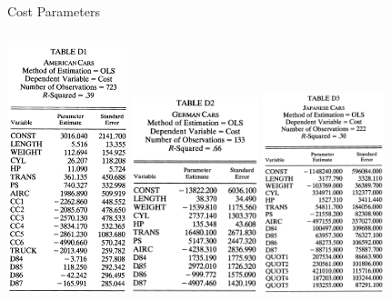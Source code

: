 \documentclass{beamer}
\begin{document}
\begin{frame}{Cost Parameters}
	\begin{columns}
		\includegraphics[width=3.5cm]{table_d1.png}
		\includegraphics[width=3.7cm]{table_d2.png}
		\includegraphics[width=3.5cm]{table_d3.png}
	\end{columns}
\end{frame}
\end{document}
